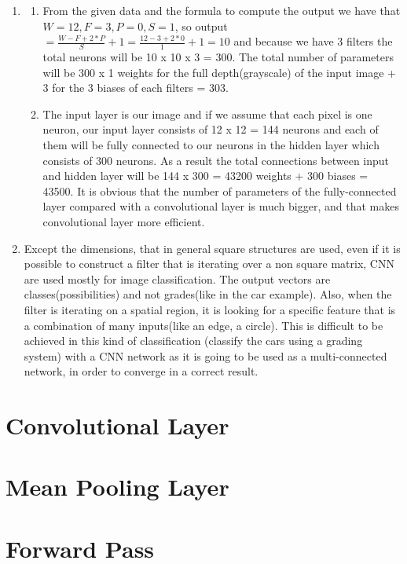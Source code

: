 \documentclass{article}
\begin{document}
\begin{enumerate}
\item 
\begin{enumerate}
\item From the given data and the formula to compute the output we have that \(W=12, F=3, P=0, S=1\), so output \(= \frac{W - F + 2 * P}{S}+1 = \frac{12 - 3 + 2 * 0}{1}+1=  10\) and because we have 3 filters the total neurons will be 10 x 10 x 3 = 300. The total number of parameters will be 300 x 1 weights for the full depth(grayscale) of the input image + 3 for the 3 biases of each filters = 303.\\
\item
 The input layer is our image and if we assume that each pixel is one neuron, our input layer consists of 12 x 12 = 144 neurons and each of them will be fully connected to our neurons in the hidden layer which consists of 300 neurons. As a result the total connections between input and hidden layer will be 144 x 300 = 43200 weights + 300 biases = 43500. It is obvious that the number of parameters of the fully-connected layer compared with a convolutional layer is much bigger, and that makes convolutional layer more efficient. \\
\end{enumerate}
\item Except the dimensions, that in general square structures are used, even if it is possible to construct a filter that is iterating over a non square matrix, CNN are used mostly for image classification. The output vectors are classes(possibilities) and not grades(like in the car example). Also, when the filter is iterating on a spatial region, it is looking for a specific feature that is a combination of many inputs(like an edge, a circle). This is difficult to be achieved in this kind of classification
(classify the cars using a grading system) with a CNN network as it is going to be used as a multi-connected network, in order to converge in a correct result.
\end{enumerate}
\setcounter{section}{+3}
\section{Convolutional Layer}

\section{Mean Pooling Layer}

\section{Forward Pass}

\end{document}
